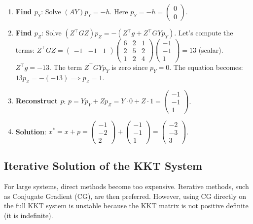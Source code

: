\begin{enumerate}
    \item \textbf{Find $p_Y$}: Solve $(AY) p_Y = -h$. Here $p_Y = -h = \begin{pmatrix} 0 \\ 0 \end{pmatrix}$.
    \item \textbf{Find $p_Z$}: Solve $(Z^\top G Z) p_Z = -(Z^\top g + Z^\top G Y p_Y)$.
    Let's compute the terms: 
    $Z^\top G Z = \begin{pmatrix} -1 & -1 & 1 \end{pmatrix} \begin{pmatrix} 6 & 2 & 1 \\ 2 & 5 & 2 \\ 1 & 2 & 4 \end{pmatrix} \begin{pmatrix} -1 \\ -1 \\ 1 \end{pmatrix} = 13$ (scalar).
    $Z^\top g = -13$.
    The term $Z^\top G Y p_Y$ is zero since $p_Y = 0$.
    The equation becomes: $13 p_Z = -(-13) \implies p_Z = 1$.
    \item \textbf{Reconstruct $p$}:
    $p = Y p_Y + Z p_Z = Y \cdot 0 + Z \cdot 1 = \begin{pmatrix} -1 \\ -1 \\ 1 \end{pmatrix}$.
    \item \textbf{Solution}:
    $x^* = x + p = \begin{pmatrix} -1 \\ -2 \\ 2 \end{pmatrix} + \begin{pmatrix} -1 \\ -1 \\ 1 \end{pmatrix} = \begin{pmatrix} -2 \\ -3 \\ 3 \end{pmatrix}$.
\end{enumerate}

\subsection{Iterative Solution of the KKT System}

For large systems, direct methods become too expensive. Iterative methods, such as Conjugate Gradient (CG), are then preferred.
However, using CG directly on the full KKT system is unstable because the KKT matrix is not positive definite (it is indefinite).

